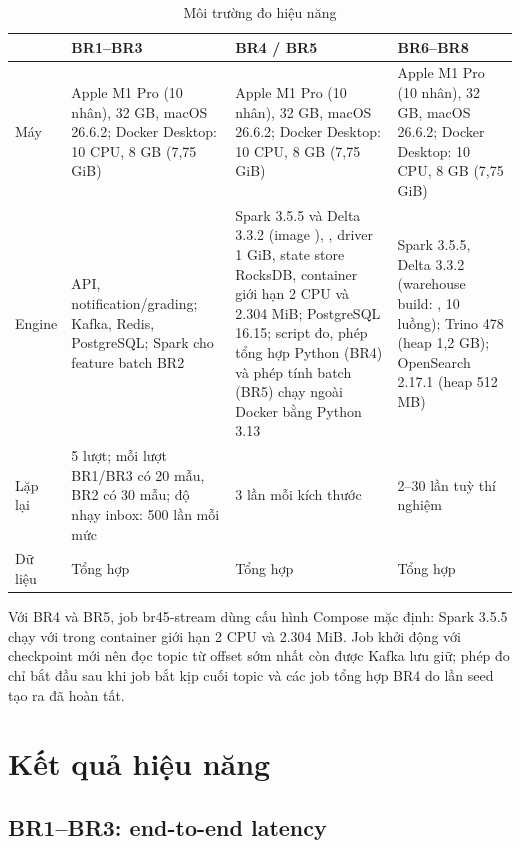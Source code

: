 \begin{table}[H]
\centering\small
\caption{Môi trường đo hiệu năng}\label{tab:env}
\begin{tabularx}{\textwidth}{@{}L{2cm}YYY@{}}
\toprule
& \textbf{BR1--BR3} & \textbf{BR4 / BR5} & \textbf{BR6--BR8} \\
\midrule
Máy & Apple M1 Pro (10 nhân), 32 GB, macOS 26.6.2; Docker Desktop: 10 CPU, 8 GB (7,75 GiB) & Apple M1 Pro (10 nhân), 32 GB, macOS 26.6.2; Docker Desktop: 10 CPU, 8 GB (7,75 GiB) & Apple M1 Pro (10 nhân), 32 GB, macOS 26.6.2; Docker Desktop: 10 CPU, 8 GB (7,75 GiB) \\
Engine & API, notification/grading; Kafka, Redis, PostgreSQL; Spark cho feature batch BR2 & Spark 3.5.5 và Delta 3.3.2 (image ), , driver 1 GiB, state store RocksDB, container giới hạn 2 CPU và 2.304 MiB; PostgreSQL 16.15; script đo, phép tổng hợp Python (BR4) và phép tính batch (BR5) chạy ngoài Docker bằng Python 3.13 & Spark 3.5.5, Delta 3.3.2 (warehouse build: , 10 luồng); Trino 478 (heap 1,2 GB); OpenSearch 2.17.1 (heap 512 MB) \\
Lặp lại & 5 lượt; mỗi lượt BR1/BR3 có 20 mẫu, BR2 có 30 mẫu; độ nhạy inbox: 500 lần mỗi mức & 3 lần mỗi kích thước & 2--30 lần tuỳ thí nghiệm \\
Dữ liệu & Tổng hợp & Tổng hợp & Tổng hợp \\
\bottomrule
\end{tabularx}
\end{table}

Với BR4 và BR5, job br45-stream dùng cấu hình Compose mặc định: Spark 3.5.5 chạy với  trong container giới hạn 2 CPU và 2.304 MiB. Job khởi động với checkpoint mới nên đọc topic  từ offset sớm nhất còn được Kafka lưu giữ; phép đo chỉ bắt đầu sau khi job bắt kịp cuối topic và các job tổng hợp BR4 do lần seed tạo ra đã hoàn tất.

\section{Kết quả hiệu năng}

\subsection{BR1--BR3: end-to-end latency}


